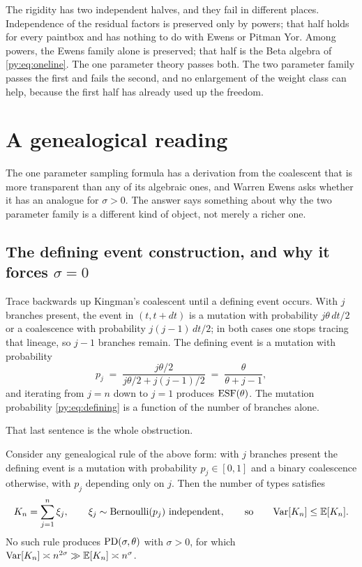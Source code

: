 The rigidity has two independent halves, and they fail in different places. Independence of the residual factors is preserved only by powers; that half holds
for every paintbox and has nothing to do with Ewens or Pitman Yor. Among powers, the Ewens family
alone is preserved; that half is the Beta algebra of \eqref{py:eq:oneline}. The one parameter theory
passes both. The two parameter family passes the first and fails the second, and no enlargement of
the weight class can help, because the first half has already used up the freedom.

\section{A genealogical reading}
\label{py:sec:coalescent}

The one parameter sampling formula has a derivation from the coalescent that is more transparent
than any of its algebraic ones, and Warren Ewens asks whether it has an analogue for $\sigma > 0$.
The answer says something about why the two parameter family is a different kind of object, not
merely a richer one.

\subsection{The defining event construction, and why it forces $\sigma = 0$}

Trace backwards up Kingman's coalescent until a defining event occurs. With $j$ branches present,
the event in $(t, t+dt)$ is a mutation with probability $j\theta\,dt/2$ or a coalescence with
probability $j(j-1)\,dt/2$; in both cases one stops tracing that lineage, so $j-1$ branches remain.
The defining event is a mutation with probability
\begin{equation}
p_j \;=\; \frac{j\theta/2}{j\theta/2 + j(j-1)/2} \;=\; \frac{\theta}{\theta+j-1},
\label{py:eq:defining}
\end{equation}
and iterating from $j = n$ down to $j = 1$ produces $\mathrm{ESF}(\theta)$. The mutation probability
\eqref{py:eq:defining} is a function of the number of branches alone.

That last sentence is the whole obstruction.

\begin{proposition}
\label{py:prop:nocoal}
Consider any genealogical rule of the above form: with $j$ branches present the defining event is a
mutation with probability $p_j \in [0,1]$ and a binary coalescence otherwise, with $p_j$ depending
only on $j$. Then the number of types satisfies
\[
K_n = \sum_{j=1}^{n}\xi_j, \qquad \xi_j \sim \mathrm{Bernoulli}(p_j) \text{ independent},
\qquad\text{so}\qquad \mathrm{Var}[K_n] \le \mathbb{E}[K_n].
\]
No such rule produces $\mathrm{PD}(\sigma,\theta)$ with $\sigma > 0$, for which
$\mathrm{Var}[K_n] \asymp n^{2\sigma} \gg \mathbb{E}[K_n] \asymp n^{\sigma}$.
\end{proposition}

